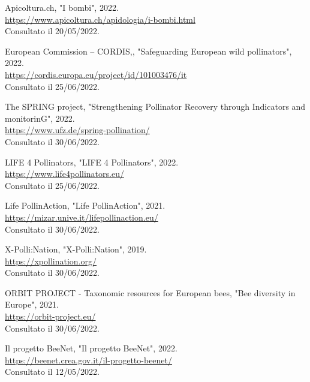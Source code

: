\documentclass[main.tex]{subfiles}
\begin{document}
\bigskip

Apicoltura.ch, "I bombi",  2022. \\
\href{https://www.apicoltura.ch/apidologia/i-bombi.html}{https://www.apicoltura.ch/apidologia/i-bombi.html}\\
Consultato il 20/05/2022.

\bigskip

European Commission – CORDIS,, "Safeguarding European wild pollinators", 2022. \\
\href{https://cordis.europa.eu/project/id/101003476/it}{https://cordis.europa.eu/project/id/101003476/it}\\
Consultato il 25/06/2022.

\bigskip

The SPRING project, "Strengthening Pollinator Recovery through Indicators and monitorinG", 2022. \\
\href{https://www.ufz.de/spring-pollination/}{https://www.ufz.de/spring-pollination/}\\
Consultato il 30/06/2022.

\bigskip

LIFE 4 Pollinators, "LIFE 4 Pollinators", 2022. \\
\href{https://www.life4pollinators.eu/}{https://www.life4pollinators.eu/}\\
Consultato il 25/06/2022.

\bigskip

Life PollinAction, "Life PollinAction", 2021. \\
\href{https://mizar.unive.it/lifepollinaction.eu/}{https://mizar.unive.it/lifepollinaction.eu/}\\
Consultato il 30/06/2022.

\bigskip

X-Polli:Nation, "X-Polli:Nation", 2019. \\
\href{https://xpollination.org/}{https://xpollination.org/}\\
Consultato il 30/06/2022.

\bigskip

ORBIT PROJECT - Taxonomic resources for European bees, "Bee diversity in Europe", 2021.  \\
\href{https://orbit-project.eu/}{https://orbit-project.eu/}\\
Consultato il 30/06/2022.

\bigskip

Il progetto BeeNet, "Il progetto BeeNet", 2022. \\
\href{https://beenet.crea.gov.it/il-progetto-beenet/}{https://beenet.crea.gov.it/il-progetto-beenet/}\\
Consultato il 12/05/2022.
\end{document}
